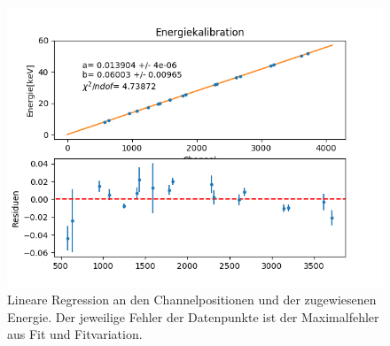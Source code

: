 \documentclass[12pt,a4paper]{article}
\begin{document}
\begin{figure}
\centering
\includegraphics[scale=0.8]{Bilder/alpha/kal.png}
\caption{Lineare Regression an den Channelpositionen und der zugewiesenen Energie. Der jeweilige Fehler der Datenpunkte ist der Maximalfehler aus Fit und Fitvariation.}
\label{fig:kal_linreg}
\end{figure}
\end{document}
